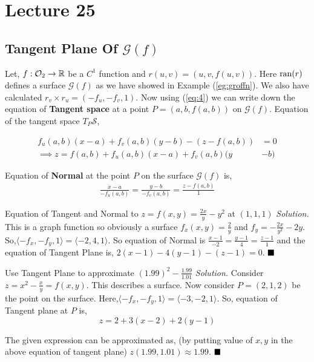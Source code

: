 \documentclass[../Analysis-3]{subfiles}
\begin{document}
\chapter*{Lecture 25} %
\setcounter{chapter}{25} %
\setcounter{section}{0}
\section{Tangent Plane Of $\mathcal{G}(f)$}

Let, $f : \mathcal{O}_2 \to \mathbb{R}$ be a $C^1$ function and $r(u,v) = (u,v,f(u,v))$. Here $\operatorname{ran}(r)$ defines a surface $\mathcal{G}(f)$ as we have showed in Example (\ref{eg:groffn}). We also have calculated $r_v\times r_u = (-f_u,-f_v,1)$. Now using (\ref{eq:4}) we can write down the equation of \textbf{Tangent space} at a point $P = (a,b,f(a,b))$ on $\mathcal{G}(f)$. Equation of the tangent space $T_P \mathcal{S}$,

\begin{align}
    f_u(a,b)(x-a) + f_v(a,b)(y-b)-(z-f(a,b))         & = 0 \nonumber     \\
    \implies z = f(a,b) + f_u(a,b)(x-a) + f_v(a,b)(y & -b) \label{eq:tp}
\end{align}

Equation of \textbf{Normal} at the point $P$ on the surface $\mathcal{G}(f)$ is,
\begin{align}\label{eq:np}
    \frac{x-a}{-f_u(a,b)} = \frac{y-b}{-f_v(a,b)} = \frac{z-f(a,b)}{1}
\end{align}

\begin{Eg}{Equation of Tangent and Normal to $z = f(x,y) = \frac{2x}{y}-y^2$ at $(1,1,1)$}{}
    \textit{Solution.} This is a graph function so obviously a surface $f_x(x,y) = \frac{2}{y}$ and $f_y = -\frac{2x}{y^2} -2y$. So,$\langle -f_x,- f_y,1 \rangle = \langle -2,4,1\rangle$. So equation of Normal
    is $\frac{x-1}{-2}=\frac{y-1}{4}=\frac{z-1}{1}$ and the equation of Tangent Plane is,
    $ 2(x-1)-4(y-1) -(z-1) = 0$. $\hfill \blacksquare $
\end{Eg}
\begin{Eg}{Use Tangent Plane to approximate $(1.99)^2 - \frac{1.99}{1.01}$}{}
    \textit{Solution.} Consider $z = x^2 - \frac{x}{y} = f(x,y)$. This describes a surface. Now consider $P=(2,1,2)$ be the point on the surface. Here,$\langle -f_x,- f_y,1 \rangle = \langle -3,-2,1\rangle$. So, equation of Tangent plane at $P$ is, \[z = 2 +3(x-2) +2(y-1)\]

    The given expression can be approximated as, (by putting value of $x,y$ in the above equation of tangent plane) $z(1.99,1.01) \approx 1.99$. $\hfill \blacksquare$
\end{Eg}
\end{document}
